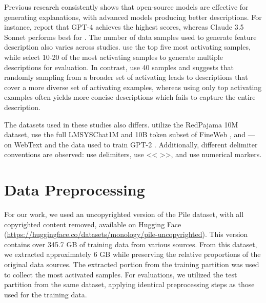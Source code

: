 Previous research consistently shows that open-source models are effective for generating explanations, with advanced models producing better descriptions. For instance, \citet{bills2023language} report that GPT-4 achieves the highest scores, whereas Claude 3.5 Sonnet performs best for \citet{paulo2024automaticallyinterpretingmillionsfeatures}. The number of data samples used to generate feature description also varies across studies. \citet{bills2023language} use the top five most activating samples, while \citet{choi2024automatic} select 10-20 of the most activating samples to generate multiple descriptions for evaluation. In contrast, \citet{paulo2024automaticallyinterpretingmillionsfeatures} use 40 samples and suggests that randomly sampling from a broader set of activating leads to descriptions that cover a more diverse set of activating examples, whereas using only top activating examples often yields more concise descriptions which fails to capture the entire description.

The datasets used in these studies also differs. \citet{paulo2024automaticallyinterpretingmillionsfeatures} utilize the RedPajama 10M \cite{together2023redpajama} dataset, \citet{choi2024automatic} use the full LMSYSChat1M \cite{zheng2023lmsys} and 10B token subset of FineWeb \cite{penedo2024the}, and \citet{bills2023language} --- on WebText\cite{radford2019language} and the data used to train GPT-2 \cite{radford2019language}. Additionally, different delimiter conventions are observed: \citet{choi2024automatic} use {} delimiters, \citet{paulo2024automaticallyinterpretingmillionsfeatures} use << >>, and \citet{bills2023language} use numerical markers.


\section{Data Preprocessing}
\label{appendix-dataset}
For our work, we used an uncopyrighted version of the Pile dataset, with all copyrighted content removed, available on Hugging Face \cite{gao2020pile} (\url{https://huggingface.co/datasets/monology/pile-uncopyrighted}). This version contains over 345.7 GB of training data from various sources. From this dataset, we extracted approximately 6 GB while preserving the relative proportions of the original data sources. The extracted portion from the training partition was used to collect the most activated samples. For evaluations, we utilized the test partition from the same dataset, applying identical preprocessing steps as those used for the training data.
    
